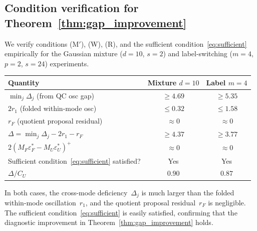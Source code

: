 \subsection{Condition verification for Theorem~\ref{thm:gap_improvement}}
\label{app:condition_check}

We verify conditions (M$'$), (W), (R), and the sufficient
condition~\eqref{eq:sufficient} empirically
for the Gaussian mixture ($d = 10$, $s = 2$) and label-switching
($m = 4$, $p = 2$, $s = 24$) experiments.

\begin{center}
\begin{tabular}{lcc}
\hline
Quantity & Mixture $d{=}10$ & Label $m{=}4$ \\
\hline
$\min_j \Delta_j$ (from QC osc gap) & $\geq 4.69$ & $\geq 5.35$ \\
$2r_1$ (folded within-mode osc) & $\leq 0.32$ & $\leq 1.58$ \\
$r_F$ (quotient proposal residual) & $\approx 0$ & $\approx 0$ \\
$\Delta = \min_j\Delta_j - 2r_1 - r_F$ & $\geq 4.37$ & $\geq 3.77$ \\
$2(M_F\varepsilon_F^* - M_U\varepsilon_U^*)^+$ & $\approx 0$ & $\approx 0$ \\
Sufficient condition~\eqref{eq:sufficient} satisfied? & Yes & Yes \\
$\Delta / C_U$ & $0.90$ & $0.87$ \\
\hline
\end{tabular}
\end{center}

In both cases, the cross-mode deficiency~$\Delta_j$ is much
larger than the folded within-mode oscillation~$r_1$, and the
quotient proposal residual~$r_F$ is negligible.  The sufficient
condition~\eqref{eq:sufficient} is easily satisfied, confirming
that the diagnostic improvement in
Theorem~\ref{thm:gap_improvement} holds.
